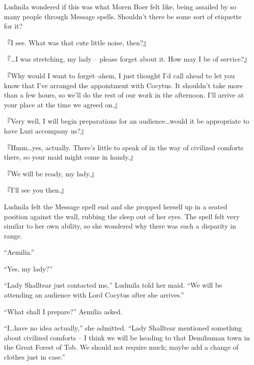  

Ludmila wondered if this was what Moren Boer felt like, being assailed by so many people through Message spells. Shouldn’t there be some sort of etiquette for it?

 

『I see. What was that cute little noise, then?』

 

『…I was stretching, my lady – please forget about it. How may I be of service?』

 

『Why would I want to forget–ahem, I just thought I’d call ahead to let you know that I’ve arranged the appointment with Cocytus. It shouldn’t take more than a few hours, so we’ll do the rest of our work in the afternoon. I’ll arrive at your place at the time we agreed on.』

 

『Very well, I will begin preparations for an audience…would it be appropriate to have Luzi accompany us?』

 

『Hmm…yes, actually. There’s little to speak of in the way of civilized comforts there, so your maid might come in handy.』

 

『We will be ready, my lady.』

 

『I’ll see you then.』

 

Ludmila felt the Message spell end and she propped herself up in a seated position against the wall, rubbing the sleep out of her eyes. The spell felt very similar to her own ability, so she wondered why there was such a disparity in range.

 

“Aemilia.”

 

“Yes, my lady?”

 

“Lady Shalltear just contacted me,” Ludmila told her maid. “We will be attending an audience with Lord Cocytus after she arrives.”

 

“What shall I prepare?” Aemilia asked.

 

“I…have no idea actually,” she admitted. “Lady Shalltear mentioned something about civilized comforts – I think we will be heading to that Demihuman town in the Great Forest of Tob. We should not require much; maybe add a change of clothes just in case.”

